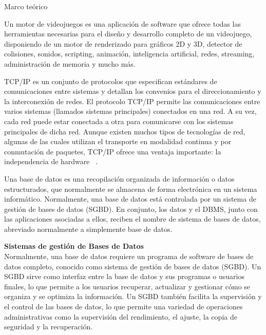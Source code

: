 \begin{thesischapter}{1} {Marco teórico}
    \vspace{10pt}

    \vspace{2pt}
    Un motor de videojuegos es una aplicación de software que ofrece
    todas las herramientas necesarias para el diseño y desarrollo completo de un videojuego, disponiendo
    de un motor de renderizado para gráficos 2D y 3D, detector de colisiones, sonidos, scripting,
    animación, inteligencia artificial, redes, streaming, administración de memoria y mucho más.~\cite{arce2011desarrollo} 
    
    \vspace{10pt}
    TCP/IP es un conjunto de protocolos que especifican estándares de comunicaciones entre sistemas y detallan los convenios 
    para el direccionamiento y la interconexión de redes. El protocolo TCP/IP permite las comunicaciones entre varios sistemas (llamados 
    sistemas principales) conectados en una red. A su vez, cada red puede estar conectada a otra para comunicarse con los 
    sistemas principales de dicha red. Aunque existen muchos tipos de tecnologías de red, algunas de las cuales utilizan el 
    transporte en modalidad continua y por conmutación de paquetes, TCP/IP ofrece una ventaja importante: la independencia 
    de hardware ~\cite{protocolo-tcp-ip}.

    \vspace{10pt}
    Una base de datos es una recopilación organizada de información o datos estructurados, que normalmente se almacena de forma 
    electrónica en un sistema informático. Normalmente, una base de datos está controlada por un sistema de gestión de bases de 
    datos (SGBD). En conjunto, los datos y el DBMS, junto con las aplicaciones asociadas a ellos, reciben el nombre de sistema 
    de bases de datos, abreviado normalmente a simplemente base de datos.~\cite{Quéesuna68}

    \vspace{10pt}
    \textbf{Sistemas de gestión de Bases de Datos}\\
    Normalmente, una base de datos requiere un programa de software de bases de datos completo, conocido como sistema de gestión de 
    bases de datos (SGBD). Un SGBD sirve como interfaz entre la base de datos y sus programas o usuarios finales, lo que permite a los 
    usuarios recuperar, actualizar y gestionar cómo se organiza y se optimiza la información. Un SGBD también facilita la supervisión 
    y el control de las bases de datos, lo que permite una variedad de operaciones administrativas como la supervisión del rendimiento, 
    el ajuste, la copia de seguridad y la recuperación.~\cite{Quéesuna68}


\end{thesischapter}
